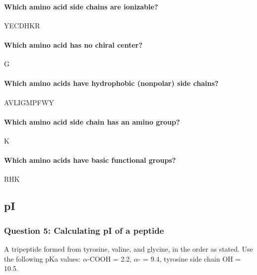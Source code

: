 \documentclass[letterpaper, 12pt]{article}
\begin{document}
\paragraph{Which amino acid side chains are ionizable?} YECDHKR

\paragraph{Which amino acid has no chiral center?} G

\paragraph{Which amino acids have hydrophobic (nonpolar) side chains?} AVLIGMPFWY

\paragraph{Which amino acid side chain has an amino group?} K

\paragraph{Which amino acids have basic functional groups?} RHK

\subsection*{pI}

\subsubsection*{Question 5: Calculating pI of a peptide}

A tripeptide formed from tyrosine, valine, and glycine, in the order as stated. Use the following pKa values: $\alpha$-COOH = 2.2, $\alpha$- = 9.4, tyrosine side chain OH = 10.5.
\end{document}
